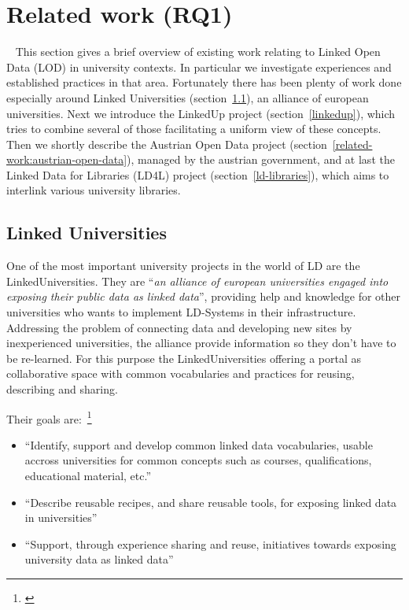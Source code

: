 \section{Related work (RQ1)}~\label{section:related_work}
This section gives a brief overview of existing work relating to Linked Open Data (LOD) in university contexts. In particular we investigate experiences and established practices in that area. Fortunately there has been plenty of work done especially around Linked Universities (section~\ref{linkeduniversities}), an alliance of european universities. Next we introduce the LinkedUp project (section~\ref{linkedup}), which tries to combine several of those facilitating a uniform view of these concepts. Then we shortly describe the Austrian Open Data project (section~\ref{related-work:austrian-open-data}), managed by the austrian government, and at last the Linked Data for Libraries (LD4L) project (section~\ref{ld-libraries}), which aims to interlink various university libraries.

\subsection{Linked Universities}\label{linkeduniversities}
One of the most important university projects in the world of LD are the LinkedUniversities. They are ``\textit{an alliance of european universities engaged into exposing their public data as linked data}''\citet{url:linkeduniversities}, providing help and knowledge for other universities who wants to implement LD-Systems in their infrastructure. Addressing the problem of connecting data and developing new sites by inexperienced universities, the alliance provide information so they don't have to be re-learned. For this purpose the LinkedUniversities offering a portal as collaborative space with common vocabularies and practices for reusing, describing and sharing.

Their goals are:~\footnote{\citet{url:linkeduniversities}}

\begin{itemize}
\item ``Identify, support and develop common linked data vocabularies, usable accross universities for common concepts such as courses, qualifications, educational material, etc.''
\item ``Describe reusable recipes, and share reusable tools, for exposing linked data in universities''
\item ``Support, through experience sharing and reuse, initiatives towards exposing university data as linked data''
\end{itemize}

